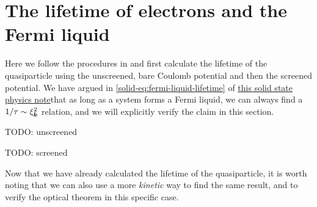 \documentclass[hyperref, a4paper]{article}
\newcommand{\soliddoc}{\href{../solid/solid.pdf}{this solid state physics note}}
\begin{document}
\section{The lifetime of electrons and the Fermi liquid}

Here we follow the procedures in \cite{dupuis} and first calculate the lifetime of the quasiparticle
using the unscreened, bare Coulomb potential and then the screened potential. We have argued in 
\eqref{solid-eq:fermi-liquid-lifetime} of \soliddoc that as long as a system forms a Fermi liquid, 
we can always find a $1 / \tau \sim \xi_{\vb*{k}}^2$ relation, and we will explicitly verify the claim 
in this section.

TODO: unscreened 

TODO: screened 

Now that we have already calculated the lifetime of the quasiparticle, it is worth noting that we can 
also use a more \emph{kinetic} way to find the same result, and to verify the optical theorem in this  
specific case. 



\end{document}
